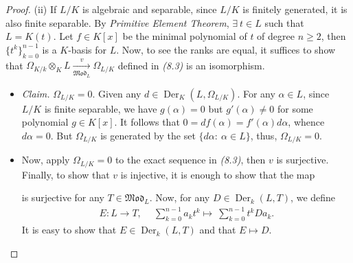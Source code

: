 \documentclass[11pt,a4paper,footinclude=true,headinclude=true]{scrbook} %
\DeclareMathOperator{\Hom}{Hom}
\DeclareMathOperator{\Der}{Der}
\newcommand{\<}{\langle}
\newcommand{\>}{\rangle}
\newcommand{\MOD}{\mathfrak{Mod}}
\begin{document}
\begin{proof}
    (ii) If $L/K$ is algebraic and separable, since $L/K$ is finitely generated, it is also finite separable. By \textit{Primitive Element Theorem}, $\exists\ t\in L$ such that $L=K(t)$. Let $f\in K[x]$ be the minimal polynomial of $t$ of degree $n\geq2$, then $\{t^k\}_{k=0}^{n-1}$ is a $K$-basis for $L$. Now, to see the ranks are equal, it suffices to show that $\Omega_{K/k}\otimes_KL\xrightarrow[\MOD_L]{v}\Omega_{L/K}$ defined in \textit{(8.3)} is an isomorphism.
    \begin{itemize}
        \item \textit{Claim.} $\Omega_{L/K}=0$. Given any $d\in\Der_K(L,\Omega_{L/K})$. For any $\alpha\in L$, since $L/K$ is finite separable, we have $g(\alpha)=0$ but $g'(\alpha)\neq0$ for some polynomial $g\in K[x]$. It follows that $0=df(\alpha)=f'(\alpha)d\alpha$, whence $d\alpha=0$. But $\Omega_{L/K}$ is generated by the set $\{d\alpha:\ \alpha\in L\}$, thus, $\Omega_{L/K}=0$.
        \item Now, apply $\Omega_{L/K}=0$ to the exact sequence in \textit{(8.3)}, then $v$ is surjective. Finally, to show that $v$ is injective, it is enough to show that the map
        \begin{center}
        \end{center}
        is surjective for any $T\in\MOD_L$. Now, for any $D\in\Der_k(L,T)$, we define
        \begin{align*}
            E:L\longrightarrow T,\quad\ \sum_{k=0}^{n-1}a_kt^k\longmapsto\ \sum_{k=0}^{n-1}t^kDa_k.
        \end{align*}
        It is easy to show that $E\in\Der_k(L,T)$ and that $E\mapsto D$.
    \end{itemize}
    

\end{proof}
\end{document}
